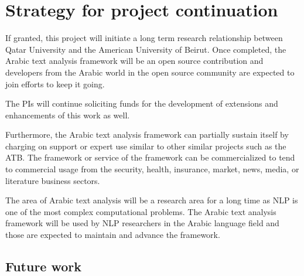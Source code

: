\documentclass[12pt]{article}
\begin{document}
\section{Strategy for project continuation}
\label{s:continue}

If granted, this project will initiate a long term
research relationship between Qatar University
and the American University of Beirut. 
Once completed, the Arabic text analysis framework will be 
an open source contribution and developers from the Arabic 
world in the open source community are expected to join 
efforts to keep it going.


The PIs will continue soliciting funds for the development
of extensions and enhancements of this work as well. 

Furthermore, the Arabic text analysis framework 
can partially sustain itself by charging on support or expert use
similar to other similar projects such as the ATB.
The framework or service of the framework can be 
commercialized to tend to commercial usage from 
the security, health, insurance, market,
news, media, or literature business sectors.
 
The area of Arabic text analysis will be a research area for 
a long time as NLP is one of the most complex computational 
problems.
The Arabic text analysis framework will be used by NLP 
researchers in the Arabic language field and those are 
expected to maintain and advance the framework.

\subsection{Future work}
\end{document}
